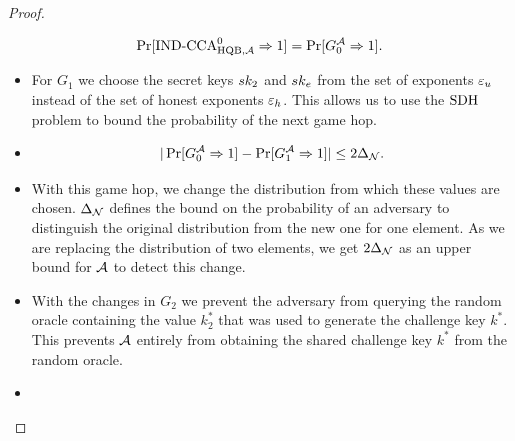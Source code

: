 \documentclass{article}
\begin{document}
\begin{proof}
\begin{itemize}
                                                \[ \Pr[\text{IND-CCA}^0_{\text{HQB},\mathcal{A}} \Rightarrow 1] = \Pr[G^{\mathcal{A}}_0 \Rightarrow 1]. \]
                                            \end{itemize}

                                            \begin{itemize}
                                            \item[\textbf{Game 1}]
                                                For $G_1$ we choose the secret keys $sk_2$ and $sk_e$ from the set of exponents $\varepsilon_u$ instead of the set of honest exponents $\varepsilon_h$.
                                                This allows us to use the $\text{SDH}$ problem to bound the probability of the next game hop.

                                            \item[\emph{Claim 1}]

                                                \[ | \Pr[G^{\mathcal{A}}_{0} \Rightarrow 1] - \Pr[G^{\mathcal{A}}_{1} \Rightarrow 1] | \leq 2 \Delta_{\mathcal{N}}. \]

                                            \item[\emph{Proof}]
                                                With this game hop, we change the distribution from which these values are chosen.
                                                $\Delta_{\mathcal{N}}$ defines the bound on the probability of an adversary to distinguish the original distribution from the new one for one element.
                                                As we are replacing the distribution of two elements, we get $2 \Delta_{\mathcal{N}}$ as an upper bound for $\mathcal{A}$ to detect this change.
                                            \end{itemize}

                                            \begin{itemize}
                                            \item[\textbf{Game 2}]
                                                With the changes in $G_2$ we prevent the adversary from querying the random oracle containing the value $k^*_2$ that was used to generate the challenge key $k^*$.
                                                This prevents $\mathcal{A}$ entirely from obtaining the shared challenge key $k^*$ from the random oracle.

                                            \item[\emph{Claim 2}]


\end{itemize}
\end{proof}
\end{document}
